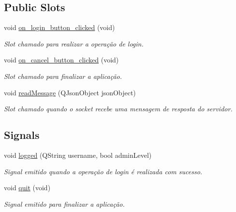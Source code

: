 \subsection*{Public Slots}
\begin{DoxyCompactItemize}
\item 
void \hyperlink{classMyLoginDialog_ab850edc55bc360a5271f8da572d9b84b}{on\+\_\+login\+\_\+button\+\_\+clicked} (void)
\begin{DoxyCompactList}\small\item\em Slot chamado para realizar a operação de login. \end{DoxyCompactList}\item 
void \hyperlink{classMyLoginDialog_a98b534e1f3e50217b7d0d603846f6fa3}{on\+\_\+cancel\+\_\+button\+\_\+clicked} (void)
\begin{DoxyCompactList}\small\item\em Slot chamado para finalizar a aplicação. \end{DoxyCompactList}\item 
void \hyperlink{classMyLoginDialog_a6def7158f19720b26ac23274b38ddc2d}{read\+Message} (Q\+Json\+Object json\+Object)
\begin{DoxyCompactList}\small\item\em Slot chamado quando o socket recebe uma mensagem de resposta do servidor. \end{DoxyCompactList}\end{DoxyCompactItemize}
\subsection*{Signals}
\begin{DoxyCompactItemize}
\item 
void \hyperlink{classMyLoginDialog_af34aa4fb816da6adb7813ced2779cc3e}{logged} (Q\+String username, bool admin\+Level)
\begin{DoxyCompactList}\small\item\em Signal emitido quando a operação de login é realizada com sucesso. \end{DoxyCompactList}\item 
void \hyperlink{classMyLoginDialog_a81b2fde13842c6557400e0e35b9dd1e0}{quit} (void)\hypertarget{classMyLoginDialog_a81b2fde13842c6557400e0e35b9dd1e0}{}\label{classMyLoginDialog_a81b2fde13842c6557400e0e35b9dd1e0}

\begin{DoxyCompactList}\small\item\em Signal emitido para finalizar a aplicação. \end{DoxyCompactList}\end{DoxyCompactItemize}
